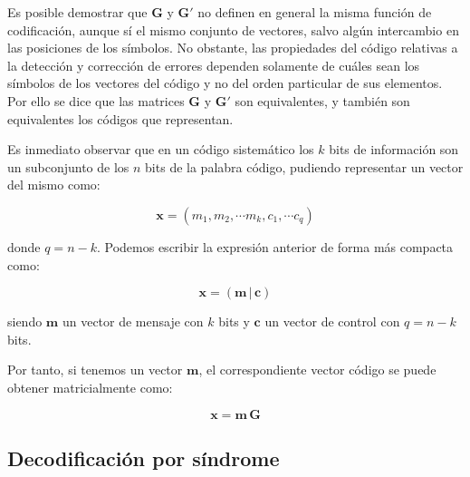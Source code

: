 \documentclass[es,apuntes]{uah}
\begin{document}
Es posible demostrar que $\mathbf{G}$ y $\mathbf{G'}$ no definen en general la misma función de codificación, aunque sí el mismo conjunto de vectores, salvo algún intercambio en las posiciones de los símbolos. No obstante, las propiedades del código relativas a la detección y corrección de errores dependen solamente de cuáles sean los símbolos de los vectores del código y no del orden particular de sus elementos. Por ello se dice que las matrices $\mathbf{G}$ y $\mathbf{G'}$ son equivalentes, y también son equivalentes los códigos que representan. 


Es inmediato observar que en un código sistemático los $k$ bits de información son un subconjunto de los $n$ bits de la palabra código, pudiendo representar un vector del mismo como:

\begin{displaymath}
	\mathbf{x} = (m_1,  m_2, \cdots m_k, c_1, \cdots c_q)
\end{displaymath}

donde $q = n-k$. Podemos escribir la expresión anterior de forma más compacta como:

\begin{displaymath}
	\mathbf{x} = ( \mathbf{m} \, | \, \mathbf{c})
\end{displaymath}

siendo $\mathbf{m}$ un vector de mensaje con $k$ bits y $\mathbf{c}$ un vector de control con $q = n-k$ bits.

Por tanto, si tenemos un vector $\mathbf{m}$, el correspondiente vector código se puede obtener matricialmente como:

\begin{displaymath}
	\mathbf{x} = \mathbf{m} \, \mathbf{G}
\end{displaymath}
 
% 
%
% 

\subsection{Decodificación por síndrome}
\end{document}
